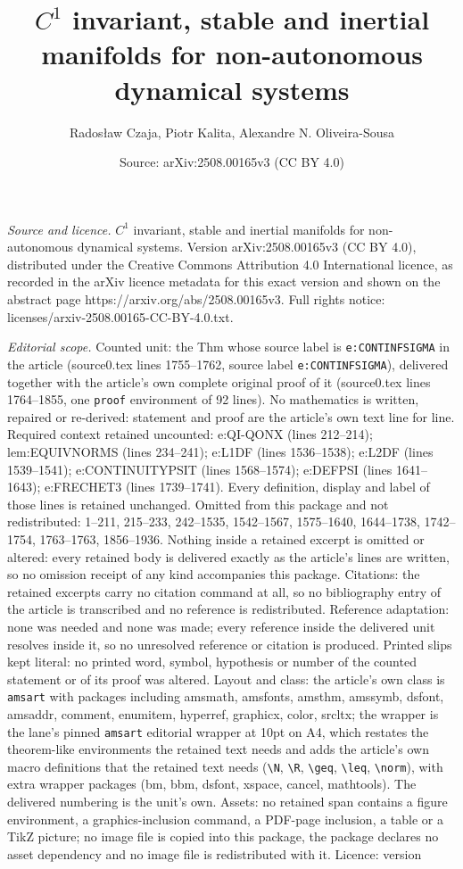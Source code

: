 \documentclass[10pt,a4paper]{amsart}
\title[$C^1$ invariant, stable and inertial manifolds for non-auton]{$C^1$ invariant, stable and inertial manifolds for non-autonomous dynamical systems}
\author{Rados{\l}aw Czaja, Piotr Kalita, Alexandre N. Oliveira-Sousa}
\date{Source: arXiv:2508.00165v3 (CC BY 4.0)}
\begin{document}
\maketitle

\noindent\emph{Source and licence.} $C^1$ invariant, stable and inertial manifolds for non-autonomous dynamical systems. Version arXiv:2508.00165v3 (CC BY 4.0), distributed under the Creative Commons Attribution 4.0 International licence, as recorded in the arXiv licence metadata for this exact version and shown on the abstract page https://arxiv.org/abs/2508.00165v3. Full rights notice: licenses/arxiv-2508.00165-CC-BY-4.0.txt.\par\smallskip

\noindent\textit{Editorial scope.} Counted unit: the Thm whose source label is \texttt{e:CONTINFSIGMA} in the article (source0.tex lines 1755--1762, source label \texttt{e:CONTINFSIGMA}), delivered together with the article's own complete original proof of it (source0.tex lines 1764--1855, one \texttt{proof} environment of 92 lines). No mathematics is written, repaired or re-derived: statement and proof are the article's own text line for line. Required context retained uncounted: e:QI-QONX (lines 212--214); lem:EQUIVNORMS (lines 234--241); e:L1DF (lines 1536--1538); e:L2DF (lines 1539--1541); e:CONTINUITYPSIT (lines 1568--1574); e:DEFPSI (lines 1641--1643); e:FRECHET3 (lines 1739--1741). Every definition, display and label of those lines is retained unchanged. Omitted from this package and not redistributed: 1--211, 215--233, 242--1535, 1542--1567, 1575--1640, 1644--1738, 1742--1754, 1763--1763, 1856--1936. Nothing inside a retained excerpt is omitted or altered: every retained body is delivered exactly as the article's lines are written, so no omission receipt of any kind accompanies this package. Citations: the retained excerpts carry no citation command at all, so no bibliography entry of the article is transcribed and no reference is redistributed. Reference adaptation: none was needed and none was made; every reference inside the delivered unit resolves inside it, so no unresolved reference or citation is produced. Printed slips kept literal: no printed word, symbol, hypothesis or number of the counted statement or of its proof was altered. Layout and class: the article's own class is \texttt{amsart} with packages including amsmath, amsfonts, amsthm, amssymb, dsfont, amsaddr, comment, enumitem, hyperref, graphicx, color, srcltx; the wrapper is the lane's pinned \texttt{amsart} editorial wrapper at 10pt on A4, which restates the theorem-like environments the retained text needs and adds the article's own macro definitions that the retained text needs (\texttt{\textbackslash N}, \texttt{\textbackslash R}, \texttt{\textbackslash geq}, \texttt{\textbackslash leq}, \texttt{\textbackslash norm}), with extra wrapper packages (bm, bbm, dsfont, xspace, cancel, mathtools). The delivered numbering is the unit's own. Assets: no retained span contains a figure environment, a graphics-inclusion command, a PDF-page inclusion, a table or a TikZ picture; no image file is copied into this package, the package declares no asset dependency and no image file is redistributed with it. Licence: version 
\end{document}
